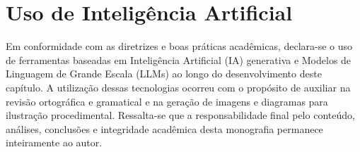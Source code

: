 \section{Uso de Inteligência Artificial}

Em conformidade com as diretrizes e boas práticas acadêmicas, declara-se o uso de ferramentas baseadas em Inteligência Artificial (IA) generativa e Modelos de Linguagem de Grande Escala (LLMs) ao longo do desenvolvimento deste capítulo. A utilização dessas tecnologias ocorreu com o propósito de auxiliar na revisão ortográfica e gramatical e na geração de imagens e diagramas para ilustração procedimental. Ressalta-se que a responsabilidade final pelo conteúdo, análises, conclusões e integridade acadêmica desta monografia permanece inteiramente ao autor.